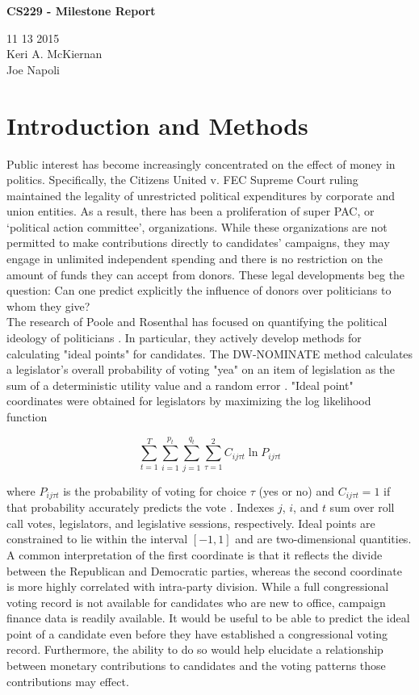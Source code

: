 \documentclass[10]{article}
\begin{document}
\begin{center}
\huge{\textbf{CS229 - Milestone Report}} \\
\end{center}
\begin{center}
\normalsize{11 13 2015} \\

Keri A. McKiernan \\
Joe Napoli
\end{center}
\section*{Introduction and Methods}
Public interest has become increasingly concentrated on the effect of money in politics. Specifically, the Citizens United v. FEC Supreme Court ruling maintained the legality of unrestricted political expenditures by corporate and union entities. As a result, there has been a proliferation of super PAC, or `political action committee',  organizations. While these organizations are not permitted to make contributions directly to candidates’ campaigns, they may engage in unlimited independent spending and there is no restriction on the amount of funds they can accept from donors. These legal developments beg the question: Can one predict explicitly the influence of donors over politicians to whom they give? \\

The research of Poole and Rosenthal has focused on quantifying the political ideology of politicians \cite{PR}. In particular, they actively develop methods for calculating "ideal points" for candidates. The DW-NOMINATE method calculates a legislator’s overall probability of voting "yea" on an item of legislation as the sum of a deterministic utility value and a random error \cite{NOMBOOT}. "Ideal point" coordinates were obtained for legislators by maximizing the log likelihood function

\[ \sum_{t=1}^{T} \sum_{i=1}^{p_t} \sum_{j=1}^{q_t} \sum_{\tau = 1}^{2} C_{ij \tau t} \ln P_{ij \tau t} \]

\noindent where $P_{ij \tau t}$ is the probability of voting for choice $\tau$ (yes or no) and $C_{ij \tau t} = 1$ if that probability accurately predicts the vote \cite{NOMBOOT}. Indexes $j$, $i$, and $t$ sum over roll call votes, legislators, and legislative sessions, respectively. Ideal points are constrained to lie within the interval $\left[ -1,1 \right]$ and are two-dimensional quantities. A common interpretation of the first coordinate is that it reflects the divide between the Republican and Democratic parties, whereas the second coordinate is more highly correlated with intra-party division. While a full congressional voting record is not available for candidates who are new to office, campaign finance data is readily available. It would be useful to be able to predict the ideal point of a candidate even before they have established a congressional voting record. Furthermore, the ability to do so would help elucidate a relationship between monetary contributions to candidates and the voting patterns those contributions may effect.\\
\end{document}
